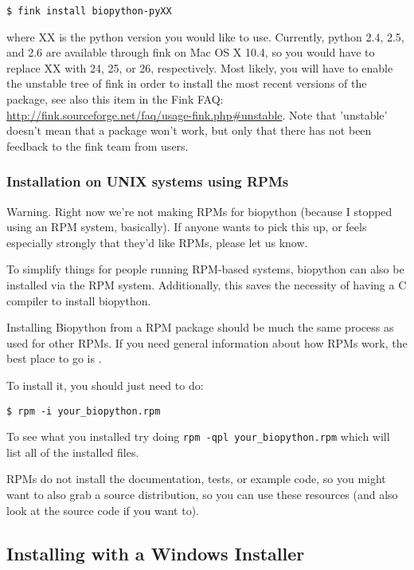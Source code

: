 \documentclass{article}
\begin{document}
\begin{verbatim}
$ fink install biopython-pyXX
\end{verbatim}

\noindent where XX is the python version you would like to use. Currently, python 2.4, 2.5, and 2.6 are available through fink on Mac OS X 10.4, so you would have to replace XX with 24, 25, or 26, respectively. Most likely, you will have to enable the unstable tree of fink in order to install the most recent versions of the package, see also this item in the Fink FAQ: \url{http://fink.sourceforge.net/faq/usage-fink.php#unstable}. Note that 'unstable' doesn't mean that a package won't work, but only that there has not been feedback to the fink team from users.

\subsubsection{Installation on UNIX systems using RPMs}

Warning. Right now we're not making RPMs for biopython (because I
stopped using an RPM system, basically). If anyone wants to pick this
up, or feels especially strongly that they'd like RPMs, please let us
know.

To simplify things for people running RPM-based systems, biopython can
also be installed via the RPM system. Additionally, this saves the 
necessity of having a C compiler to install biopython. 

Installing Biopython from a RPM package should be much the same process as used for other RPMs. If you need general information about how RPMs work, the best place to go is .

To install it, you should just need to do:

\begin{verbatim}
$ rpm -i your_biopython.rpm
\end{verbatim}

To see what you installed try doing \verb|rpm -qpl your_biopython.rpm| which will list all of the installed files.

RPMs do not install the documentation, tests, or example code, so you might want to also grab a source distribution, so you can use these resources (and also look at the source code if you want to).

\subsection{Installing with a Windows Installer}
\end{document}
